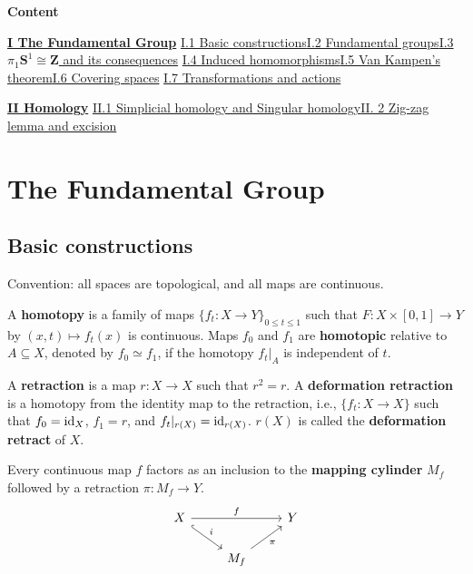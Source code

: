 \documentclass[11pt]{article}
\newcommand{\forceindent}{\leavevmode{\parindent=1.5em\indent}}
\theoremstyle{definition}
\theoremstyle{plain}
\theoremstyle{remark}
\newcommand{\id}{\textup{id}}
\newcommand{\Z}{\mathbf{Z}}
\begin{document}
\textbf{\Large{Content}}\bigbreak

\hyperref[1]{\textbf{I The Fundamental Group}}\newline
\forceindent\hyperref[2]{I.1 Basic constructions}\quad\hyperref[3]{I.2 Fundamental groups}\quad\hyperref[4]{I.3 $\pi_1\mathbf{S}^1\cong\Z$ and its consequences}\newline
\forceindent\hyperref[6]{I.4 Induced homomorphisms}\quad\hyperref[7]{I.5 Van Kampen's theorem}\quad\hyperref[8]{I.6 Covering spaces}\newline
\forceindent\hyperref[9]{I.7 Transformations and actions}\medbreak

\hyperref[10]{\textbf{II Homology}}\newline
\forceindent\hyperref[11]{II.1 Simplicial homology and Singular homology}\quad\hyperref[12]{II. 2 Zig-zag lemma and excision}

\newpage
\section{The Fundamental Group}\label{1}

\subsection{Basic constructions}\label{2}

Convention: all spaces are topological, and all maps are continuous.\medbreak

A \textbf{homotopy} is a family of maps $\{f_t:X\to Y\}_{0\leq t\leq1}$ such that $F:X\times[0,1]\to Y$ by $(x,t)\mapsto f_t(x)$ is continuous. Maps $f_0$ and $f_1$ are \textbf{homotopic} relative to $A\subseteq X$, denoted by $f_0\simeq f_1$, if the homotopy $f_t|_A$ is independent of $t$.\medbreak

A \textbf{retraction} is a map $r:X\to X$ such that $r^2=r$. A \textbf{deformation retraction} is a homotopy from the identity map to the retraction, i.e., $\{f_t:X\to X\}$ such that $f_0=\id_X$, $f_1=r$, and $f_t|_{r(X)}=\id_{r(X)}$. $r(X)$ is called the \textbf{deformation retract} of $X$.\medbreak

Every continuous map $f$ factors as an inclusion to the \textbf{mapping cylinder} $M_f$ followed by a retraction $\pi:M_f\to Y$.
\[\begin{tikzcd}
X\arrow[hookrightarrow]{dr}{i}\arrow{rr}{f}&&Y\\
&M_f\arrow[swap]{ur}{\pi}
\end{tikzcd}\]\medbreak
\end{document}
